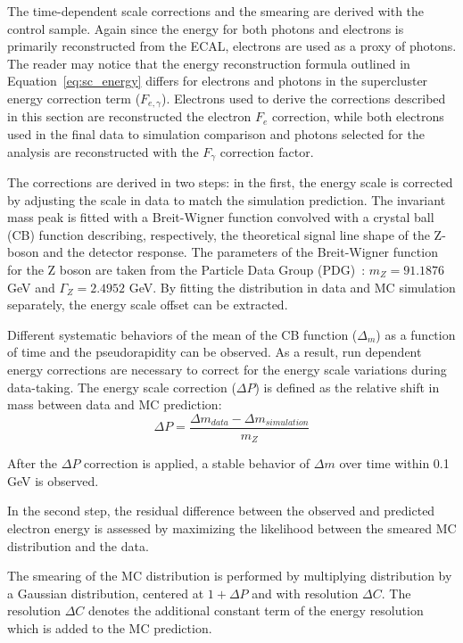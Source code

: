 The time-dependent scale corrections and the smearing are derived with the \Zee control sample.
Again since the energy for both photons and electrons is primarily reconstructed from the ECAL, electrons
are used as a proxy of photons. The reader may notice that the energy reconstruction formula outlined in
Equation~\ref{eq:sc_energy} differs for electrons and photons in the supercluster energy correction term ($F_{e,\gamma}$).
Electrons used to derive the corrections described in this section are reconstructed the electron $F_e$ correction,
while both electrons used in the final data to simulation comparison and photons selected for the analysis
are reconstructed with the $F_{\gamma}$ correction factor.

The corrections are derived in two steps: in the first, the energy scale is corrected by
adjusting the scale in data to match the simulation prediction. The \Zee invariant mass peak is fitted with
a Breit-Wigner function convolved with a crystal ball (CB) function describing, respectively,
the theoretical signal line shape of the Z-boson and the detector response.
The parameters of the Breit-Wigner function for the Z boson are taken from the Particle
Data Group (PDG)~\cite{PDG}: $m_Z = 91.1876$ GeV and $\Gamma_Z = 2.4952$ GeV.
By fitting the distribution in data and MC simulation separately, the energy scale offset can be extracted.

Different systematic behaviors of the mean of the CB function ($\Delta_m$) as a function of time and the
pseudorapidity can be observed. As a result, run dependent energy corrections are
necessary to correct for the energy scale variations during data-taking. The energy scale
correction ($\Delta P$) is defined as the relative shift in mass between data and MC prediction:
\[
  \Delta P = \frac{\Delta m_{data} - \Delta m_{simulation}}{m_Z}
\]

After the $\Delta P$ correction is applied, a stable behavior of $\Delta m$ over time within
0.1 GeV is observed.

In the second step, the residual difference between the observed and predicted electron
energy is assessed by maximizing the likelihood between the smeared MC distribution and the data.

The smearing of the MC distribution is performed by multiplying \scE distribution by a
Gaussian distribution, centered at $1 + \Delta P$ and with resolution $\Delta C$.
The resolution $\Delta C$ denotes the additional constant term of the energy resolution which
is added to the MC prediction.

